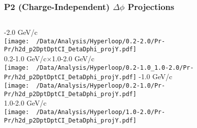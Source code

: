 \documentclass{beamer}
\begin{document}
\begin{frame}
	\frametitle{P2 (Charge-Independent) $\Delta\phi$ Projections}
	\begin{columns}
		-2.0 GeV/c\\
		\texttt{[image: ~/Data/Analysis/Hyperloop/0.2-2.0/Pr-Pr/h2d\_p2DptDptCI\_DetaDphi\_projY.pdf]}\\0.2-1.0 GeV/c$\times$1.0-2.0 GeV/c\\
		\texttt{[image: ~/Data/Analysis/Hyperloop/0.2-1.0\_1.0-2.0/Pr-Pr/h2d\_p2DptDptCI\_DetaDphi\_projY.pdf]}
		-1.0 GeV/c\\
		\texttt{[image: ~/Data/Analysis/Hyperloop/0.2-1.0/Pr-Pr/h2d\_p2DptDptCI\_DetaDphi\_projY.pdf]}\\1.0-2.0 GeV/c\\
		\texttt{[image: ~/Data/Analysis/Hyperloop/1.0-2.0/Pr-Pr/h2d\_p2DptDptCI\_DetaDphi\_projY.pdf]}
	\end{columns}
\end{frame}
\end{document}
